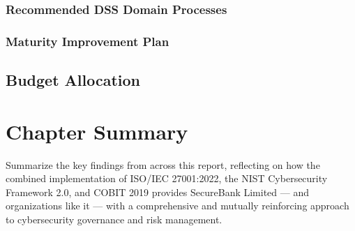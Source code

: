 \subsubsection{Recommended DSS Domain Processes}


\subsubsection{Maturity Improvement Plan}



\subsection{Budget Allocation}




\section*{Chapter Summary}

Summarize the key findings from across this report, reflecting on how the combined implementation of ISO/IEC 27001:2022, the NIST Cybersecurity Framework 2.0, and COBIT 2019 provides SecureBank Limited --- and organizations like it --- with a comprehensive and mutually reinforcing approach to cybersecurity governance and risk management.
